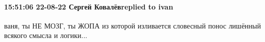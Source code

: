  
 
 
 
 

\paragraph{15:51:06 22-08-22 Сергей Ковалёвreplied to ivan}

ваня, ты НЕ МОЗГ, ты ЖОПА из которой изливается словесный понос лишённый всякого смысла и логики...
